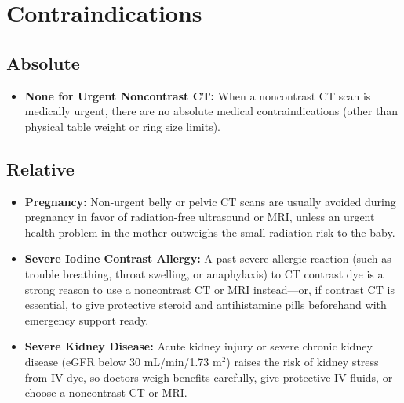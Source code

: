 \section{Contraindications}

\subsection{Absolute}
\begin{itemize}
    \item \textbf{None for Urgent Noncontrast CT:} When a noncontrast CT scan is medically urgent, there are no absolute medical contraindications (other than physical table weight or ring size limits).
\end{itemize}

\subsection{Relative}
\begin{itemize}
    \item \textbf{Pregnancy:} Non-urgent belly or pelvic CT scans are usually avoided during pregnancy in favor of radiation-free ultrasound or MRI, unless an urgent health problem in the mother outweighs the small radiation risk to the baby.
    \item \textbf{Severe Iodine Contrast Allergy:} A past severe allergic reaction (such as trouble breathing, throat swelling, or anaphylaxis) to CT contrast dye is a strong reason to use a noncontrast CT or MRI instead---or, if contrast CT is essential, to give protective steroid and antihistamine pills beforehand with emergency support ready.
    \item \textbf{Severe Kidney Disease:} Acute kidney injury or severe chronic kidney disease (eGFR below 30 mL/min/1.73 m$^2$) raises the risk of kidney stress from IV dye, so doctors weigh benefits carefully, give protective IV fluids, or choose a noncontrast CT or MRI.
\end{itemize}

